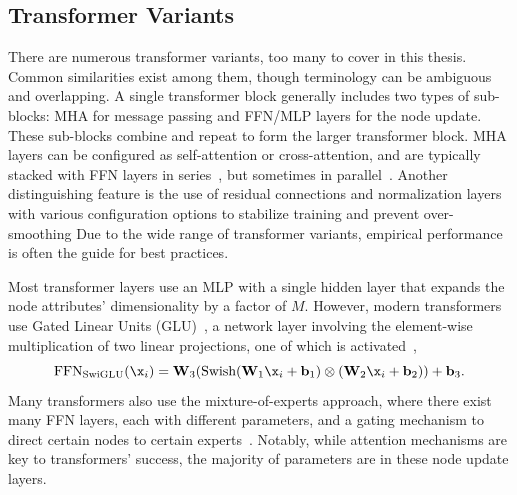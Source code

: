 
\subsection{Transformer Variants}
\label{sec:transformer_variants}

There are numerous transformer variants, too many to cover in this thesis.
Common similarities exist among them, though terminology can be ambiguous and overlapping.
A single transformer block generally includes two types of sub-blocks: MHA for message passing and FFN/MLP layers for the node update.
These sub-blocks combine and repeat to form the larger transformer block.
MHA layers can be configured as self-attention or cross-attention, and are typically stacked with FFN layers in series~\cite{Attention}, but sometimes in parallel~\cite{Palm}.
Another distinguishing feature is the use of residual connections and normalization layers with various configuration options to stabilize training and prevent over-smoothing
Due to the wide range of transformer variants, empirical performance is often the guide for best practices.

Most transformer layers use an MLP with a single hidden layer that expands the node attributes' dimensionality by a factor of $M$.
However, modern transformers use Gated Linear Units (GLU)~\cite{GLU}, a network layer involving the element-wise multiplication of two linear projections, one of which is activated~\cite{SwiGLU},
\begin{equation}
    \text{FFN}_\text{SwiGLU}(\x_i) = \mathbf{W}_3(\text{Swish}(\mathbf{W}_1 \x_i + \mathbf{b}_1) \otimes (\mathbf{W}_2 \x_i + \mathbf{b}_2)) + \mathbf{b}_3.
\end{equation}
Many transformers also use the mixture-of-experts approach, where there exist many FFN layers, each with different parameters, and a gating mechanism to direct certain nodes to certain experts~\cite{MOE}.
Notably, while attention mechanisms are key to transformers' success, the majority of parameters are in these node update layers.

